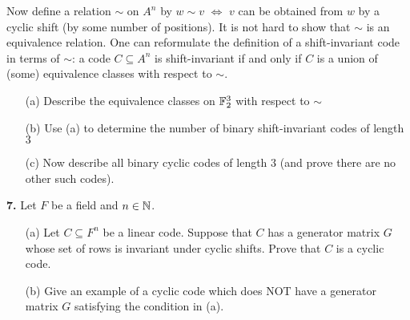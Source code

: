\documentclass[12pt]{amsart}
\begin{document}
Now define a relation $\sim$ on $A^n$ by $w\sim v$ $\iff$ $v$ can be obtained from $w$ by a cyclic shift (by some number of positions). It is not hard to show that $\sim$ is an equivalence relation. One can reformulate the definition of a shift-invariant code in terms of $\sim$: a code $C\subseteq A^n$ is shift-invariant if and only if $C$ is a union of (some) equivalence classes with respect to $\sim$.

\begin{itemize}
\item[(a)] Describe the equivalence classes on ${\mathbb F}_2^3$ with respect to $\sim$
\item[(b)] Use (a) to determine the number of binary shift-invariant codes of length $3$
\item[(c)] Now describe all binary cyclic codes of length $3$ (and prove there are no other such codes).
\end{itemize}
\skv
{\bf 7.} Let $F$ be a field and $n\in{\mathbb N}$.
\begin{itemize}
\item[(a)] Let $C\subseteq F^n$ be a linear code. Suppose that $C$ has a generator matrix $G$ whose set of rows is invariant under cyclic shifts. Prove that $C$ is a cyclic code.
  
\item[(b)] Give an example of a cyclic code which does NOT have a generator matrix $G$ satisfying the condition in (a).
\end{itemize}
\end{document}
